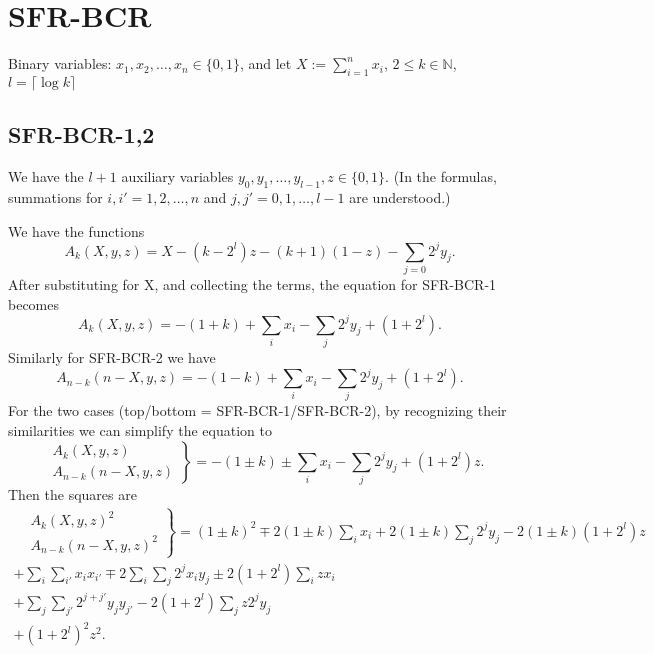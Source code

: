 \documentclass[a4paper,11pt]{article}
\newcommand{\ceil}[1]{\lceil #1 \rceil}
\begin{document}
\section{SFR-BCR}

Binary variables: $x_1,x_2,\dots,x_n\in\{0,1\}$, 
and let $X:=\sum_{i=1}^n x_i$, $2\leq k\in\mathbb{N}$, $l = \ceil{\log k}$

\subsection{SFR-BCR-1,2}
We have the $l+1$ auxiliary variables $y_0,y_1,\dots,y_{l-1},z\in\{0,1\}$.
(In the formulas, summations for $i,i' = 1,2,\dots,n$ and $j,j' = 0,1,\dots,l-1$ are understood.)

We have the functions
\begin{equation}
\label{eq:Ak}
A_k(X,y,z) = X - (k-2^l)z - (k+1)(1-z) - \sum_{j=0}2^jy_j.
\end{equation}
After substituting for X, and collecting the terms, the equation for SFR-BCR-1 becomes
\begin{equation}
\label{eq:Ak1}
A_k(X,y,z) = -(1+k) +\sum_i x_i - \sum_{j}2^jy_j + (1+2^l).
\end{equation}
Similarly for SFR-BCR-2 we have
\begin{equation}
\label{eq:Ak2}
A_{n-k}({n-X},y,z) = -(1-k) +\sum_i x_i - \sum_{j}2^jy_j + (1+2^l).
\end{equation}
For the  two cases
(top/bottom = SFR-BCR-1/SFR-BCR-2),
by recognizing their similarities we can simplify the equation to
\begin{equation}
\label{eq:Ak12}
\left.\begin{aligned}
&A_k(X,y,z) \\
&A_{n-k}({n-X},y,z)
\end{aligned}\right\}
= -(1\pm k) \pm \sum_i x_i - \sum_j 2^jy_j + (1+2^l)z.
\end{equation}
Then the squares are
\begin{equation}
\label{eq:Ak12sq}
\begin{split}
\left.\begin{aligned}
&A_k(X,y,z)^2 \\
&A_{n-k}({n-X},y,z)^2 
\end{aligned}\right\}
= (1\pm k)^2 \mp2(1\pm k)\sum_i x_i +2(1\pm k)\sum_j 2^jy_j -2(1\pm k)(1+2^l)z & \\
+ \sum_i\sum_{i'} x_ix_{i'} \mp2\sum_i\sum_j 2^jx_iy_j \pm2 (1+2^l)\sum_i zx_i & \\
+ \sum_j\sum_{j'} 2^{j+j'}y_jy_{j'} - 2(1+2^l)\sum_j z 2^jy_j & \\
+ (1+2^l)^2z^2. &
\end{split}
\end{equation}
\end{document}
